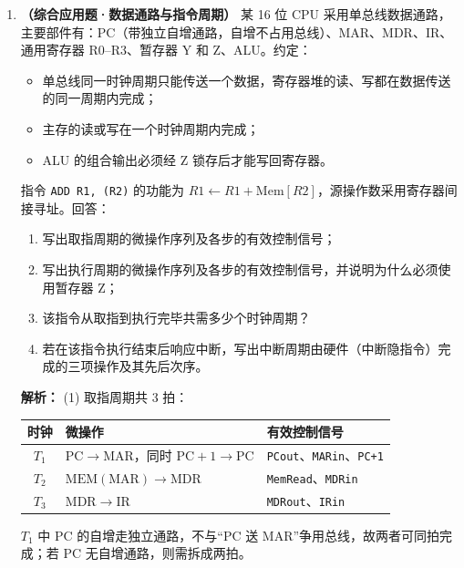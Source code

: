 \begin{enumerate}[resume]
\item \textbf{（综合应用题·数据通路与指令周期）} 某 16 位 CPU 采用单总线数据通路，主要部件有：PC（带独立自增通路，自增不占用总线）、MAR、MDR、IR、通用寄存器 R0--R3、暂存器 Y 和 Z、ALU。约定：
\begin{itemize}
    \item 单总线同一时钟周期只能传送一个数据，寄存器堆的读、写都在数据传送的同一周期内完成；
    \item 主存的读或写在一个时钟周期内完成；
    \item ALU 的组合输出必须经 Z 锁存后才能写回寄存器。
\end{itemize}
指令 \texttt{ADD R1, (R2)} 的功能为 $R1 \leftarrow R1+\mathrm{Mem}[R2]$，源操作数采用寄存器间接寻址。回答：
\begin{enumerate}
    \item[(1)] 写出取指周期的微操作序列及各步的有效控制信号；
    \item[(2)] 写出执行周期的微操作序列及各步的有效控制信号，并说明为什么必须使用暂存器 Z；
    \item[(3)] 该指令从取指到执行完毕共需多少个时钟周期？
    \item[(4)] 若在该指令执行结束后响应中断，写出中断周期由硬件（中断隐指令）完成的三项操作及其先后次序。
\end{enumerate}

\ifshowsolutions\par\noindent\textbf{解析：} (1) 取指周期共 3 拍：
\begin{center}
\small
\begin{tabular}{cll}
\hline
时钟 & 微操作 & 有效控制信号 \\
\hline
$T_1$ & $\mathrm{PC}\to\mathrm{MAR}$，同时 $\mathrm{PC}+1\to\mathrm{PC}$ & \texttt{PCout}、\texttt{MARin}、\texttt{PC+1} \\
$T_2$ & $\mathrm{MEM}(\mathrm{MAR})\to\mathrm{MDR}$ & \texttt{MemRead}、\texttt{MDRin} \\
$T_3$ & $\mathrm{MDR}\to\mathrm{IR}$ & \texttt{MDRout}、\texttt{IRin} \\
\hline
\end{tabular}
\end{center}
$T_1$ 中 PC 的自增走独立通路，不与“PC 送 MAR”争用总线，故两者可同拍完成；若 PC 无自增通路，则需拆成两拍。


\end{enumerate}
